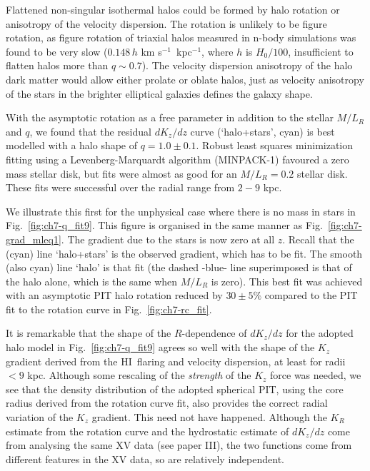\documentclass[traditabstract]{aa} %
\newcommand\HI{H{\small I}}
\newcommand\kms{km s$^{-1}$}
\begin{document}
Flattened non-singular isothermal halos could be formed by halo
rotation or anisotropy of the velocity dispersion.  The rotation
is unlikely to be figure rotation, as figure rotation of triaxial
halos measured in n-body simulations was found to be very slow
\citep{bs2004} ($0.148\,h$ \kms\ kpc$^{-1}$, where $h$ is $H_0/100$,
insufficient to flatten halos more than $q\sim0.7$). The velocity dispersion anisotropy
of the halo dark matter would allow either prolate or oblate halos, just as 
velocity anisotropy of the stars in the brighter elliptical galaxies defines 
the galaxy shape.

With the asymptotic rotation as a free parameter in addition to the
stellar $M/L_R$ and $q$, we found that the residual $dK_z/dz$ curve
(`halo+stars', cyan) is
best modelled with a halo shape of $q=1.0\pm0.1$. Robust least squares
minimization fitting using a Levenberg-Marquardt algorithm (MINPACK-1)
favoured a zero mass stellar disk, but fits were almost as good for an
$M/L_R=0.2$ stellar disk. These fits were successful over the radial
range from $2-9$ kpc. 

We illustrate this first for the unphysical case where there is no mass in stars 
in Fig.~\ref{fig:ch7-q_fit9}. This figure
is organised in the same manner as Fig.~\ref{fig:ch7-grad_mleq1}.
The gradient due to the stars is now zero at all $z$. Recall that
the (cyan) line `halo+stars' is the observed gradient, which has
to be fit. The smooth (also cyan) line `halo' is that fit (the
dashed -blue- line superimposed is that of the halo alone, which
is the same when $M/L_R$ is zero). This best fit was achieved with
an asymptotic PIT halo rotation reduced by $30\pm5\%$ compared to
the PIT fit to the rotation curve in Fig.~\ref{fig:ch7-rc_fit}. 

It is remarkable that the shape of the $R$-dependence of $dK_z/dz$
for the adopted halo model in Fig.~\ref{fig:ch7-q_fit9} agrees so well with the
shape of the $K_z$ gradient derived from the \HI\ flaring and velocity
dispersion, at least for radii $< 9$ kpc. Although some rescaling of
the {\it strength} of the $K_z$ force was needed, we see that the
density distribution of the adopted spherical PIT, using the core
radius derived from the rotation curve fit, also provides the correct
radial variation of the $K_z$ gradient.  This need not have happened.
Although the $K_R$ estimate from the rotation curve and the hydrostatic
estimate of $dK_z/dz$ come from analysing the same XV data (see paper
III), the two functions come from different features in the XV data, so
are relatively independent.
\end{document}

